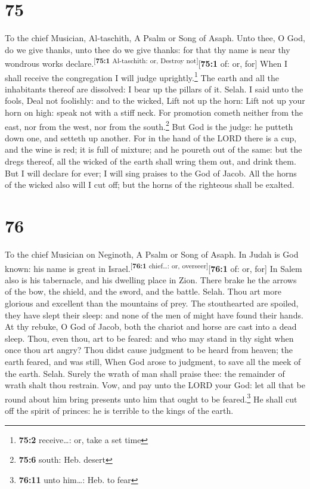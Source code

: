 \hypertarget{section-74}{%
\section{75}\label{section-74}}

To the chief Musician, Al-taschith, A Psalm or Song of Asaph.
 Unto thee, O God, do we give thanks, unto thee do we give
thanks: for that thy name is near thy wondrous works
declare.\textsuperscript{{[}\textbf{75:1} Al-taschith: or, Destroy
not{]}}{[}\textbf{75:1} of: or, for{]}  When I shall
receive the congregation I will judge uprightly.\footnote{\textbf{75:2}
  receive\ldots: or, take a set time}  The earth and all
the inhabitants thereof are dissolved: I bear up the pillars of it.
Selah.  I said unto the fools, Deal not foolishly: and to
the wicked, Lift not up the horn:  Lift not up your horn
on high: speak not with a stiff neck.  For promotion
cometh neither from the east, nor from the west, nor from the
south.\footnote{\textbf{75:6} south: Heb. desert}  But God
is the judge: he putteth down one, and setteth up another.
 For in the hand of the LORD there is a cup, and the wine
is red; it is full of mixture; and he poureth out of the same: but the
dregs thereof, all the wicked of the earth shall wring them out, and
drink them.  But I will declare for ever; I will sing
praises to the God of Jacob.  All the horns of the wicked
also will I cut off; but the horns of the righteous shall be exalted.

\hypertarget{section-75}{%
\section{76}\label{section-75}}

To the chief Musician on Neginoth, A Psalm or Song of Asaph.
 In Judah is God known: his name is great in
Israel.\textsuperscript{{[}\textbf{76:1} chief\ldots: or,
overseer{]}}{[}\textbf{76:1} of: or, for{]}  In Salem also
is his tabernacle, and his dwelling place in Zion.  There
brake he the arrows of the bow, the shield, and the sword, and the
battle. Selah.  Thou art more glorious and excellent than
the mountains of prey.  The stouthearted are spoiled, they
have slept their sleep: and none of the men of might have found their
hands.  At thy rebuke, O God of Jacob, both the chariot
and horse are cast into a dead sleep.  Thou, even thou,
art to be feared: and who may stand in thy sight when once thou art
angry?  Thou didst cause judgment to be heard from heaven;
the earth feared, and was still,  When God arose to
judgment, to save all the meek of the earth. Selah. 
Surely the wrath of man shall praise thee: the remainder of wrath shalt
thou restrain.  Vow, and pay unto the LORD your God: let
all that be round about him bring presents unto him that ought to be
feared.\footnote{\textbf{76:11} unto him\ldots: Heb. to fear}
 He shall cut off the spirit of princes: he is terrible
to the kings of the earth.

